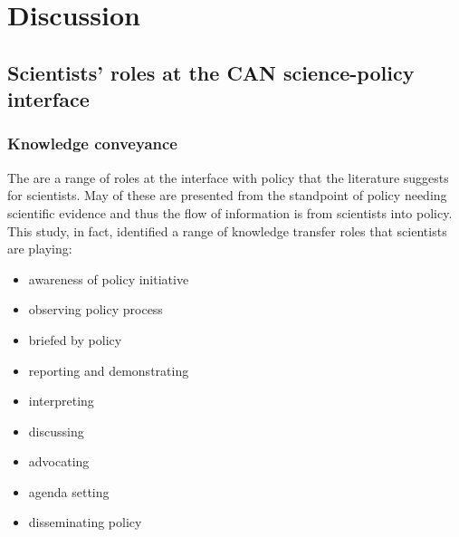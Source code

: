 \chapter{Discussion}\label{ch:discussion}


\section{Scientists' roles at the CAN science-policy interface}\label{sec:disroles}


\subsection{Knowledge conveyance}\label{sec:disknowrole}
The are a range of roles at the interface with policy that the literature suggests for scientists. May of these are presented from the standpoint of policy needing scientific evidence and thus the flow of information is from scientists into policy. This study, in fact, identified a range of knowledge transfer roles that scientists are playing:
\begin{itemize}
    \item awareness of policy initiative
    \item observing policy process
    \item briefed by policy
    \item reporting and demonstrating
    \item interpreting
    \item discussing
    \item advocating
    \item agenda setting
    \item disseminating policy
\end{itemize}

